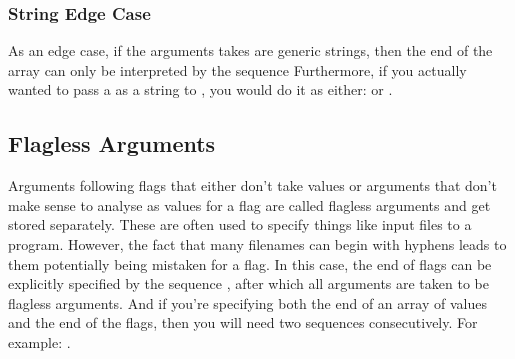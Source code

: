 \subsubsection{\monotext{--} String Edge Case}
As an edge case, if the arguments  takes are generic strings, then the end of the array can only be interpreted by the sequence \monotext{--} Furthermore, if you actually wanted to pass a \monotext{--} as a string to , you would do it as either:  or .

\subsection{Flagless Arguments}

Arguments following flags that either don't take values or arguments that don't make sense to analyse as values for a flag are called flagless arguments and get stored separately. These are often used to specify things like input files to a program. However, the fact that many filenames can begin with hyphens leads to them potentially being mistaken for a flag. In this case, the end of flags can be explicitly specified by the sequence \monotext{--}, after which all arguments are taken to be flagless arguments. And if you're specifying both the end of an array of values and the end of the flags, then you will need two \monotext{--} sequences consecutively. For example: .